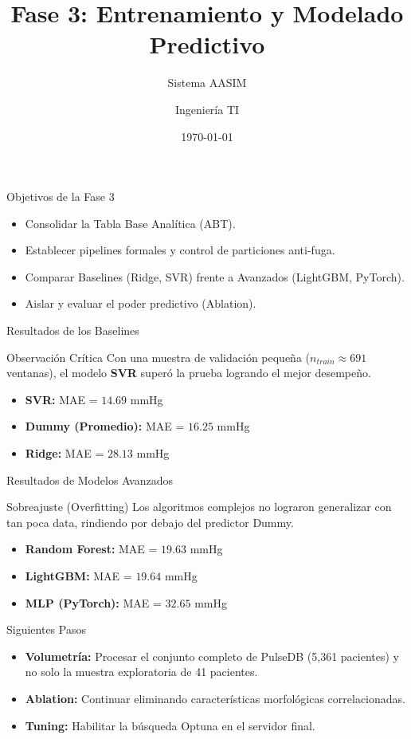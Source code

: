 \documentclass{beamer}
\title{Fase 3: Entrenamiento y Modelado Predictivo}
\subtitle{Sistema AASIM}
\author{Ingeniería TI}
\date{\today}
\begin{document}
\begin{frame}
    \titlepage
\end{frame}

\begin{frame}{Objetivos de la Fase 3}
    \begin{itemize}
        \item Consolidar la Tabla Base Analítica (ABT).
        \item Establecer pipelines formales y control de particiones anti-fuga.
        \item Comparar Baselines (Ridge, SVR) frente a Avanzados (LightGBM, PyTorch).
        \item Aislar y evaluar el poder predictivo (Ablation).
    \end{itemize}
\end{frame}

\begin{frame}{Resultados de los Baselines}
    \begin{block}{Observación Crítica}
    Con una muestra de validación pequeña ($n_{train} \approx 691$ ventanas), el modelo \textbf{SVR} superó la prueba logrando el mejor desempeño.
    \end{block}
    
    \begin{itemize}
        \item \textbf{SVR:} MAE = $14.69$ mmHg
        \item \textbf{Dummy (Promedio):} MAE = $16.25$ mmHg
        \item \textbf{Ridge:} MAE = $28.13$ mmHg
    \end{itemize}
\end{frame}

\begin{frame}{Resultados de Modelos Avanzados}
    \begin{block}{Sobreajuste (Overfitting)}
    Los algoritmos complejos no lograron generalizar con tan poca data, rindiendo por debajo del predictor Dummy.
    \end{block}
    
    \begin{itemize}
        \item \textbf{Random Forest:} MAE = $19.63$ mmHg
        \item \textbf{LightGBM:} MAE = $19.64$ mmHg
        \item \textbf{MLP (PyTorch):} MAE = $32.65$ mmHg
    \end{itemize}
\end{frame}

\begin{frame}{Siguientes Pasos}
    \begin{itemize}
        \item \textbf{Volumetría:} Procesar el conjunto completo de PulseDB (5,361 pacientes) y no solo la muestra exploratoria de 41 pacientes.
        \item \textbf{Ablation:} Continuar eliminando características morfológicas correlacionadas.
        \item \textbf{Tuning:} Habilitar la búsqueda Optuna en el servidor final.
    \end{itemize}
\end{frame}
\end{document}
